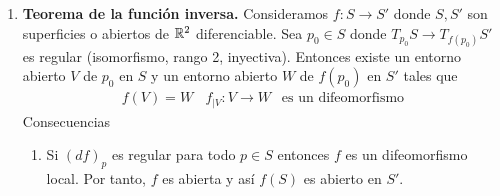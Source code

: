 \begin{propiedades}
\begin{enumerate}
        \begin{proof}
            Dado $a\in Im(f)$ podemos definir
            \begin{gather*}
                A=\{p\in S : f(p)=a\} = f^{-1}(\{a\}) \subset S
            \end{gather*}
            Sabemos que $A\neq \emptyset$ porque $a\in Im(f)$ y además es cerrado por ser imagen inversa de un cerrado en $\bb{R}$. Basta ver que $A$ es abierto en $S$. Dado un $p\in A$ podemos considerar una parametrización $X:U \subset \bb{R}^2 \to S$ tal que $p\in X(U)$. Tenemos que 
            \begin{gather*}
                f_{|X(U)} = (f\circ X) \circ X^{-1}
            \end{gather*}
            Aplicando la regla de la cadena recién probada tenemos que 
            \begin{gather*}
                0 = (df)_q = d((f\circ X)\circ X^{-1})_q = d(f\circ X)_{X^{-1}(q)} \circ (dX^{-1})_q
            \end{gather*}
            Como $(dX^{-1})_q$ es un isomorfismo, necesariamente tenemos que 
            \begin{gather*}
                d(f\circ X)_{X^{-1}(q)}=0
            \end{gather*}
            Aplicando propiedades de análisis sabemos que $f\circ X : U\subset \bb{R}^2 \to \bb{R}^m$ con diferencial cero en cada punto por lo que $f\circ X$ es constante lo que nos dice que 
            \begin{gather*}
                f_{|X(U)} = a \ \ \ \text{ constante} \Rightarrow p\in X(U)\subset A
            \end{gather*}
            Finalmente hemos probado que $A$ contiene un entorno abierto para cada $p\in A$, luego $A$ es abierto.
        \end{proof}

        \item \textbf{Teorema de la función inversa.} Consideramos $f:S\to S'$ donde $S,S'$ son superficies o abiertos de $\mathbb{R}^2$ diferenciable. Sea $p_0\in S$ donde $T_{p_0}S \to T_{f(p_0)}S'$ es regular (isomorfismo, rango 2, inyectiva). Entonces existe un entorno abierto $V$ de $p_0$ en $S$ y un entorno abierto $W$ de $f(p_0)$ en $S'$ tales que 
        \begin{gather*}
            f(V)=W \ \ \ \ f_{|V}: V \to W \ \ \text{ es un difeomorfismo}
        \end{gather*}
        Consecuencias
        \begin{enumerate}
            \item Si $(df)_p$ es regular para todo $p\in S$ entonces $f$ es un difeomorfismo local. Por tanto, $f$ es abierta y así $f(S)$ es abierto en $S'$.
            

\end{enumerate}
\end{enumerate}
\end{propiedades}
